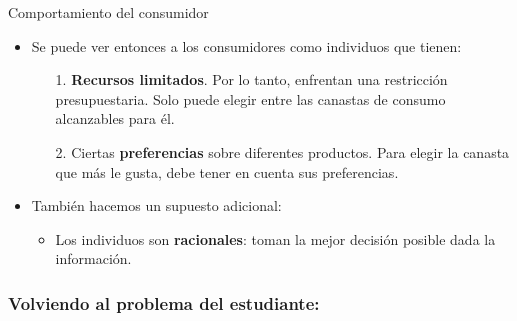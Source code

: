 \documentclass{beamer}
\begin{document}
\begin{frame}{Comportamiento del consumidor}
    \begin{itemize}
        \item Se puede ver entonces a los consumidores como individuos que tienen: \vspace{-2mm}
        \begin{itemize}
            \item[1.] \textbf{Recursos limitados}. Por lo tanto, enfrentan una restricción presupuestaria. Solo puede elegir entre las canastas de consumo alcanzables
            para él.
            \item[2.] Ciertas \textbf{preferencias} sobre diferentes productos. Para elegir la canasta que más le gusta, debe tener en cuenta
            sus preferencias.
        \end{itemize}
        \item También hacemos un supuesto adicional:
        \begin{itemize}
        \item Los individuos son \textbf{racionales}: toman la mejor decisión posible dada la información.
        \end{itemize}
    \end{itemize} 
\end{frame}

\begin{frame}
    \frametitle{Volviendo al problema del estudiante:}
    \begin{center}
    \end{center}
\end{frame}
\end{document}
